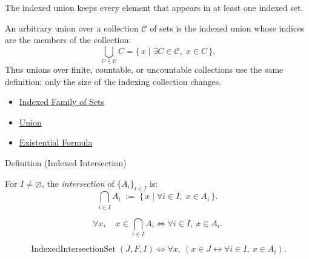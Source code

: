 \begin{remark*}[Interpretation]
The indexed union keeps every element that appears in at least one indexed set.
\end{remark*}

\begin{remark*}[Exposition]
An arbitrary union over a collection $\mathcal{C}$ of sets is the indexed
union whose indices are the members of the collection:
\[
\bigcup_{C\in\mathcal{C}} C
=
\{\, x \mid \exists C\in\mathcal{C},\; x\in C \,\}.
\]
Thus unions over finite, countable, or uncountable collections use the same
definition; only the size of the indexing collection changes.
\end{remark*}


\begin{dependencies}
\begin{itemize}
  \item \hyperref[def:indexed-family]{Indexed Family of Sets}
  \item \hyperref[def:union]{Union}
  \item \hyperref[def:existential-q]{Existential Formula}
\end{itemize}
\end{dependencies}

\begin{definitionbox}{Definition (Indexed Intersection)}
\begin{definition}\label{def:indexed-intersection}
For $I \neq \varnothing$, the \emph{intersection} of $\{A_i\}_{i \in I}$ is:
\[
\bigcap_{i \in I} A_i
\;:=\;
\{\, x \mid \forall i \in I,\; x \in A_i \,\}.
\]
\end{definition}
\end{definitionbox}

\begin{remark*}
\[
  \forall x,\quad
  x\in\bigcap_{i\in I}A_i
  \iff
  \forall i\in I,\ x\in A_i.
\]
\end{remark*}

\begin{remark*}
\[
  \operatorname{IndexedIntersectionSet}(J,F,I)
  \iff
  \forall x,\ (x\in J\leftrightarrow \forall i\in I,\ x\in A_i).
\]
\end{remark*}

